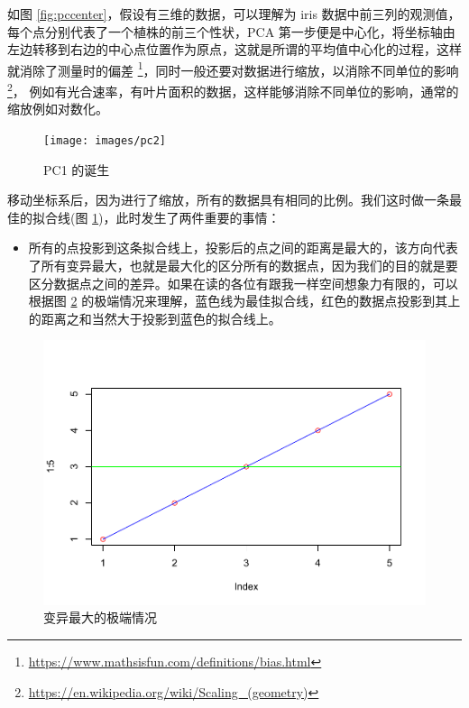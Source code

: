 \documentclass[
]{krantz}
\providecommand{\tightlist}{%
  \setlength{\itemsep}{0pt}\setlength{\parskip}{0pt}}
\begin{document}
如图 \ref{fig:pccenter}，假设有三维的数据，可以理解为 iris 数据中前三列的观测值，每个点分别代表了一个植株的前三个性状，PCA 第一步便是中心化，将坐标轴由左边转移到右边的中心点位置作为原点，这就是所谓的平均值中心化的过程，这样就消除了测量时的偏差 \footnote{\url{https://www.mathsisfun.com/definitions/bias.html}}，同时一般还要对数据进行缩放，以消除不同单位的影响 \footnote{\url{https://en.wikipedia.org/wiki/Scaling_(geometry)}}，
例如有光合速率，有叶片面积的数据，这样能够消除不同单位的影响，通常的缩放例如对数化。

\begin{figure}
\texttt{[image: images/pc2]} \caption{PC1 的诞生}\label{fig:pc2}
\end{figure}

移动坐标系后，因为进行了缩放，所有的数据具有相同的比例。我们这时做一条最佳的拟合线(图 \ref{fig:pc2})，此时发生了两件重要的事情：

\begin{itemize}
\tightlist
\item
  所有的点投影到这条拟合线上，投影后的点之间的距离是最大的，该方向代表了所有变异最大，也就是最大化的区分所有的数据点，因为我们的目的就是要区分数据点之间的差异。如果在读的各位有跟我一样空间想象力有限的，可以根据图 \ref{fig:maxvar} 的极端情况来理解，蓝色线为最佳拟合线，红色的数据点投影到其上的距离之和当然大于投影到蓝色的拟合线上。
\end{itemize}

\begin{figure}
\centering
\includegraphics{bookdown_files/figure-latex/maxvar-1.pdf}
\caption{\label{fig:maxvar}变异最大的极端情况}
\end{figure}
\end{document}
